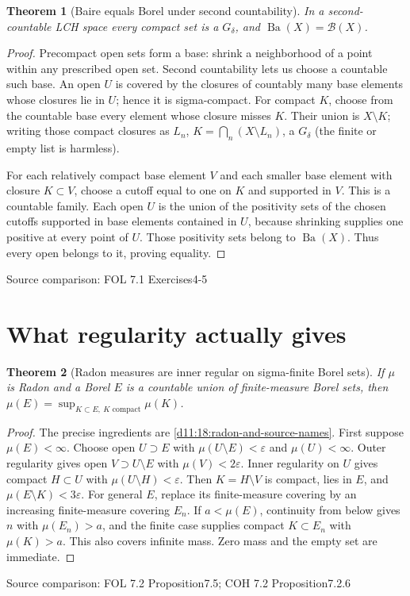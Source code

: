 \documentclass[11pt,oneside,openany]{book}
\newtheorem{theorem}{Theorem}[chapter]
\theoremstyle{definition}
\theoremstyle{remark}
\newcommand{\eps}{\varepsilon}\newcommand{\ee}{\varepsilon}
\newcommand{\BB}{\mathcal B}\newcommand{\SSS}{\mathcal S}
\newcommand{\family}[1]{}
\newcommand{\source}[1]{\par\begingroup\small\sffamily\color{black!65}Source comparison: #1\par\endgroup}
\begin{document}
\begin{theorem}[Baire equals Borel under second countability]\family{D11.18.baire_borel_second_countable}\label{d11:18:baire-borel-second-countable}
In a second-countable LCH space every compact set is a $G_\delta$, and $\operatorname{Ba}(X)=\BB(X)$.
\end{theorem}
\begin{proof}
Precompact open sets form a base: shrink a neighborhood of a point within any prescribed open set. Second countability lets us choose a countable such base. An open $U$ is covered by the closures of countably many base elements whose closures lie in $U$; hence it is sigma-compact. For compact $K$, choose from the countable base every element whose closure misses $K$. Their union is $X\setminus K$; writing those compact closures as $L_n$, $K=\bigcap_n(X\setminus L_n)$, a $G_\delta$ (the finite or empty list is harmless).

For each relatively compact base element $V$ and each smaller base element with closure $K\subset V$, choose a cutoff equal to one on $K$ and supported in $V$. This is a countable family. Each open $U$ is the union of the positivity sets of the chosen cutoffs supported in base elements contained in $U$, because shrinking supplies one positive at every point of $U$. Those positivity sets belong to $\operatorname{Ba}(X)$. Thus every open belongs to it, proving equality.
\end{proof}
\source{FOL 7.1 Exercises4-5}

\section{What regularity actually gives}

\begin{theorem}[Radon measures are inner regular on sigma-finite Borel sets]\family{D11.18.radon_sigmafinite_inner}\label{d11:18:radon-sigmafinite-inner}
If $\mu$ is Radon and a Borel $E$ is a countable union of finite-measure Borel sets, then $\mu(E)=\sup_{K\subset E,\ K\text{ compact}}\mu(K)$.
\end{theorem}
\begin{proof}
The precise ingredients are \cref{d11:18:radon-and-source-names}. First suppose $\mu(E)<\infty$. Choose open $U\supset E$ with $\mu(U\setminus E)<\eps$ and $\mu(U)<\infty$. Outer regularity gives open $V\supset U\setminus E$ with $\mu(V)<2\eps$. Inner regularity on $U$ gives compact $H\subset U$ with $\mu(U\setminus H)<\eps$. Then $K=H\setminus V$ is compact, lies in $E$, and $\mu(E\setminus K)<3\eps$. For general $E$, replace its finite-measure covering by an increasing finite-measure covering $E_n$. If $a<\mu(E)$, continuity from below gives $n$ with $\mu(E_n)>a$, and the finite case supplies compact $K\subset E_n$ with $\mu(K)>a$. This also covers infinite mass. Zero mass and the empty set are immediate.
\end{proof}
\source{FOL 7.2 Proposition7.5; COH 7.2 Proposition7.2.6}
\end{document}
